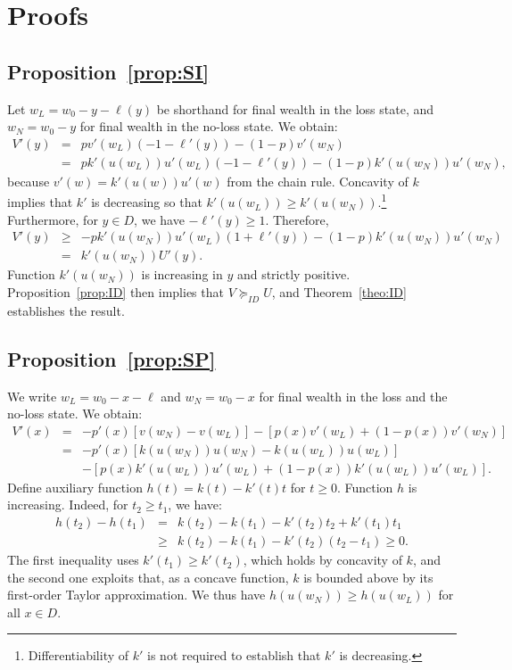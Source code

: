 \documentclass[11pt]{article}
\begin{document}
\section{Proofs}
\subsection{Proposition~\ref{prop:SI}}\label{app:prop_SI}

Let $w_L=w_0-y-\ell(y)$ be shorthand for final wealth in the loss state, and $w_N=w_0-y$ for final wealth in the no-loss state. We obtain:
\begin{eqnarray*}
	V'(y) & = & pv'(w_L)(-1-\ell'(y))-(1-p)v'(w_N) \\
		  & = & p k'(u(w_L)) u'(w_L)(-1-\ell'(y)) - (1-p)k'(u(w_N))u'(w_N),
\end{eqnarray*}
because $v'(w)=k'(u(w))u'(w)$ from the chain rule. Concavity of $k$ implies that $k'$ is decreasing so that $k'(u(w_L)) \geq k'(u(w_N))$.\footnote{Differentiability of $k'$ is not required to establish that $k'$ is decreasing.} Furthermore, for $y \in D$, we have $-\ell'(y) \geq 1$. Therefore,
\begin{eqnarray*}
	V'(y) & \geq & -p k'(u(w_N)) u'(w_L)(1+\ell'(y)) - (1-p)k'(u(w_N))u'(w_N) \\
		  & = & k'(u(w_N)) U'(y).
\end{eqnarray*}
Function $k'(u(w_N))$ is increasing in $y$ and strictly positive. Proposition~\ref{prop:ID} then implies that $V \succeq_{ID} U$, and Theorem~\ref{theo:ID} establishes the result.

\subsection{Proposition~\ref{prop:SP}}\label{app:prop_SP}

We write $w_L=w_0-x-\ell$ and $w_N=w_0-x$ for final wealth in the loss and the no-loss state. We obtain:
\begin{eqnarray*}
	V'(x) & = & -p'(x) \left[v(w_N)-v(w_L) \right] - \left[p(x)v'(w_L)+(1-p(x))v'(w_N) \right] \\
	& = & -p'(x) \left[k(u(w_N))u(w_N)-k(u(w_L))u(w_L) \right] \\
	& & -\left[ p(x)k'(u(w_L))u'(w_L)+(1-p(x))k'(u(w_L))u'(w_L) \right].
\end{eqnarray*}
Define auxiliary function $h(t)=k(t)-k'(t)t$ for $t \geq 0$. Function $h$ is increasing. Indeed, for $t_2 \geq t_1$, we have:
\begin{eqnarray*}
	h(t_2)-h(t_1) & = & k(t_2)-k(t_1)-k'(t_2)t_2 + k'(t_1)t_1 \\
	& \geq & k(t_2)-k(t_1) -k'(t_2)(t_2-t_1) \geq 0.
\end{eqnarray*}
The first inequality uses $k'(t_1) \geq k'(t_2)$, which holds by concavity of $k$, and the second one exploits that, as a concave function, $k$ is bounded above by its first-order Taylor approximation. We thus have $h(u(w_N)) \geq h(u(w_L))$ for all $x \in D$.
\end{document}
